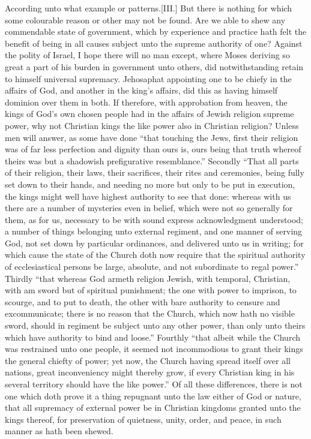 According unto what example or patterns.[III.] But there is nothing for which some colourable reason or other may not be found. Are we able to shew any commendable state of government, which by experience and practice hath felt the benefit of being in all causes subject unto the supreme authority of one? Against the polity of  Israel, I hope there will no man except, where Moses deriving so great a part of his burden in government unto others, did notwithstanding retain to himself universal supremacy. Jehosaphat appointing one to be chiefy in the affairs of God, and another in the king’s affairs, did this as having himself dominion over them in both. If therefore, with approbation from heaven, the kings of God’s own chosen people had in the affairs of Jewish religion supreme power, why not Christian kings the like power also in Christian religion? Unless men will answer, as some have done “that touching the Jews, first their religion was of far less perfection and dignity than ours is, ours being that truth whereof theirs was but a shadowish prefigurative resemblance.” Secondly “That all parts of their religion, their laws, their sacrifices, their rites and ceremonies, being fully set down to their hands, and needing no more but only to be put in execution, the kings might well have highest authority to see that done: whereas with us there are a number of mysteries even in belief, which were not so generally for them, as for us, necessary to be with sound express acknowledgment understood; a number of things belonging unto external regiment, and one manner of serving God, not set down by particular ordinances, and  delivered unto us in writing; for which cause the state of the Church doth now require that the spiritual authority of ecclesiastical persons be large, absolute, and not subordinate to regal power.” Thirdly “that whereas God armeth religion Jewish, with temporal, Christian, with am sword but of spiritual punishment; the one with power to imprison, to scourge, and to put to death, the other with bare authority to censure and excommunicate; there is no reason that the Church, which now hath no visible sword, should in regiment be subject unto any other power, than only unto theirs which have authority to bind and loose.” Fourthly “that albeit while the Church was restrained unto one people, it seemed not incommodious to grant their kings the general chiefty of power; yet now, the Church having spread itself over all nations, great inconveniency might thereby grow, if every Christian king in his several territory should have the like power.” Of all these differences, there is not one which doth prove it a thing repugnant unto the law either of God or nature, that all supremacy of external power be in Christian kingdoms granted unto the kings thereof, for preservation of quietness, unity, order, and peace, in such manner as hath been shewed.


